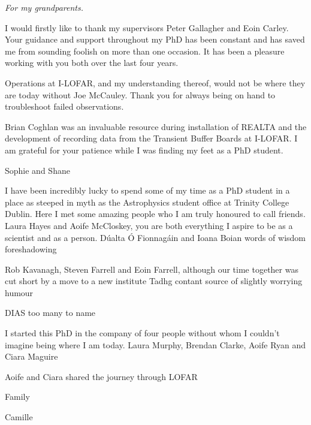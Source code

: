 
\begin{dedication}
\textit{For my grandparents.}
\end{dedication}

\begin{acknowledgements}
I would firstly like to thank my supervisors Peter Gallagher and Eoin Carley. Your guidance and support throughout my PhD has been constant and has saved me from sounding foolish on more than one occasion. It has been a pleasure working with you both over the last four years.

Operations at I-LOFAR, and my understanding thereof, would not be where they are today without Joe McCauley. Thank you for always being on hand to troubleshoot failed observations.

Brian Coghlan was an invaluable resource during installation of REALTA and the development of recording data from the Transient Buffer Boards at I-LOFAR. I am grateful for your patience while I was finding my feet as a PhD student. 

Sophie and Shane

I have been incredibly lucky to spend some of my time as a PhD student in a place as steeped in myth as the Astrophysics student office at Trinity College Dublin. Here I met some amazing people who I am truly honoured to call friends. Laura Hayes and Aoife McCloskey, you are both everything I aspire to be as a scientist and as a person.  Dúalta Ó Fionnagáin and Ioana Boian words of wisdom foreshadowing

Rob Kavanagh, Steven Farrell and Eoin Farrell, although our time together was cut short by a move to a new institute 
Tadhg contant source of slightly worrying humour

DIAS too many to name 

I started this PhD in the company of four people without whom I couldn't imagine being where I am today. Laura Murphy, Brendan Clarke, Aoife Ryan and Ciara Maguire

Aoife and Ciara shared the journey through LOFAR

Family

Camille

\end{acknowledgements}

